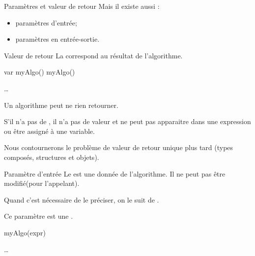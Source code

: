 \begin{hideedit}
\begin{frame}{Paramètres et valeur de retour}
  \pause
  Mais il existe aussi :
  \begin{itemize}
    \item paramètres d'entrée;
    \item paramètres en entrée-sortie.
  \end{itemize}
\end{frame}

\begin{frame}{Valeur de retour}
  La  correspond au résultat de l'algorithme.

  \begin{minipage}{4.5cm}
    \begin{pseudocode}
      \Stmt var \Gets myAlgo()
      \Stmt myAlgo()
    \end{pseudocode}
  \end{minipage}
  \hfill
  \begin{minipage}{6.5cm}
    \begin{pseudocode}
      \Stmt \dots
      \EndAlgo 
    \end{pseudocode}
  \end{minipage}

  \pause
  Un algorithme peut ne rien retourner.

  \pause
  S'il n'a pas de \Gives, il n'a pas de valeur et ne peut pas apparaitre dans
  une expression ou être assigné à une variable.

  \pause
  Nous contournerons le problème de valeur de retour unique plus tard
  (types composés, structures et objets).
\end{frame}

\begin{frame}[fragile]{Paramètre d'entrée}
  Le  est une donnée de l'algorithme. Il ne peut
  pas être modifié\pause (pour l'appelant).

  Quand c'est nécessaire de le préciser, on le suit de \In.

  Ce paramètre est une .

  \vfill
  \begin{center}
  \begin{minipage}{4.5cm}
    \begin{pseudocode}
\Stmt myAlgo(expr)
\Empty
    \end{pseudocode}
  \end{minipage}
  \hfill
  \begin{minipage}{7cm}
    \begin{pseudocode}
\Stmt \dots
\EndAlgo 
    \end{pseudocode}
  \end{minipage}
  \end{center}


\end{frame}
\end{hideedit}
